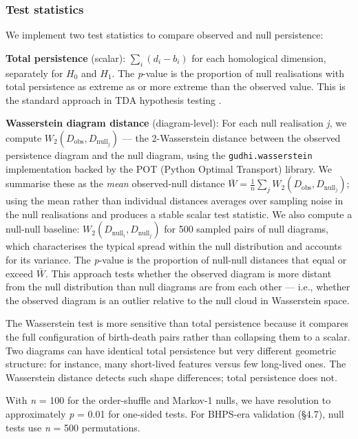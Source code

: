 \subsubsection{Test statistics}

We implement two test statistics to compare observed and null persistence:

\textbf{Total persistence} (scalar): $\sum_i (d_i - b_i)$ for each homological dimension, separately for $H_0$ and $H_1$. The \textit{p}-value is the proportion of null realisations with total persistence as extreme as or more extreme than the observed value. This is the standard approach in TDA hypothesis testing \citep{robinson2017hypothesis}.

\textbf{Wasserstein diagram distance} (diagram-level): For each null realisation \textit{j}, we compute $W_2(D_{\text{obs}}, D_{\text{null}_j})$ --- the 2-Wasserstein distance between the observed persistence diagram and the null diagram, using the \texttt{gudhi.wasserstein} implementation backed by the POT (Python Optimal Transport) library. We summarise these as the \textit{mean} observed-null distance $\bar{W} = \frac{1}{n}\sum_j W_2(D_{\text{obs}}, D_{\text{null}_j})$; using the mean rather than individual distances averages over sampling noise in the null realisations and produces a stable scalar test statistic. We also compute a null-null baseline: $W_2(D_{\text{null}_i}, D_{\text{null}_j})$ for 500 sampled pairs of null diagrams, which characterises the typical spread within the null distribution and accounts for its variance. The \textit{p}-value is the proportion of null-null distances that equal or exceed $\bar{W}$. This approach tests whether the observed diagram is more distant from the null distribution than null diagrams are from each other --- i.e., whether the observed diagram is an outlier relative to the null cloud in Wasserstein space.

The Wasserstein test is more sensitive than total persistence because it compares the full configuration of birth-death pairs rather than collapsing them to a scalar. Two diagrams can have identical total persistence but very different geometric structure: for instance, many short-lived features versus few long-lived ones. The Wasserstein distance detects such shape differences; total persistence does not.

With \textit{n} = 100 for the order-shuffle and Markov-1 nulls, we have resolution to approximately \textit{p} = 0.01 for one-sided tests. For BHPS-era validation (\S4.7), null tests use \textit{n} = 500 permutations.

